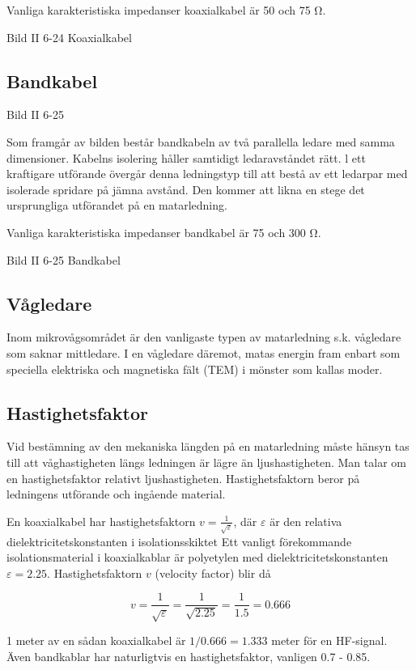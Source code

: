 Vanliga karakteristiska impedanser koaxialkabel är 50 och 75 Ω.

Bild II 6-24 Koaxialkabel

\subsection{Bandkabel}

Bild II 6-25

Som framgår av bilden består bandkabeln av två parallella ledare med
samma dimensioner. Kabelns isolering håller samtidigt ledaravståndet
rätt. l ett kraftigare utförande övergår denna ledningstyp till att
bestå av ett ledarpar med isolerade spridare på jämna avstånd. Den
kommer att likna en stege det ursprungliga utförandet på en
matarledning.

Vanliga karakteristiska impedanser bandkabel är 75 och 300 Ω.

Bild II 6-25 Bandkabel

\subsection{Vågledare}

Inom mikrovågsområdet är den vanligaste typen av matarledning
s.k. vågledare som saknar mittledare. I en vågledare däremot, matas
energin fram enbart som speciella elektriska och magnetiska fält (TEM)
i mönster som kallas moder.

\subsection{Hastighetsfaktor}

Vid bestämning av den mekaniska längden på en matarledning måste
hänsyn tas till att våghastigheten längs ledningen är lägre än
ljushastigheten. Man talar om en hastighetsfaktor relativt
ljushastigheten. Hastighetsfaktorn beror på ledningens utförande och
ingående material.

En koaxialkabel har hastighetsfaktorn \(v =
\frac{1}{\sqrt{\varepsilon}}\), där \(\varepsilon\) är den relativa
dielektricitetskonstanten i isolationsskiktet Ett vanligt förekommande
isolationsmaterial i koaxialkablar är polyetylen med
dielektricitetskonstanten \(\varepsilon = 2.25\).  Hastighetsfaktorn
\(v\) (velocity factor) blir då

\[
v = \frac{1}{\sqrt{\varepsilon}} = \frac{1}{\sqrt{2.25}} = \frac{1}{1.5} = 0.666
\]

1 meter av en sådan koaxialkabel är \(1/0.666 = 1.333\) meter för en
HF-signal.  Även bandkablar har naturligtvis en hastighetsfaktor,
vanligen 0.7 - 0.85.

